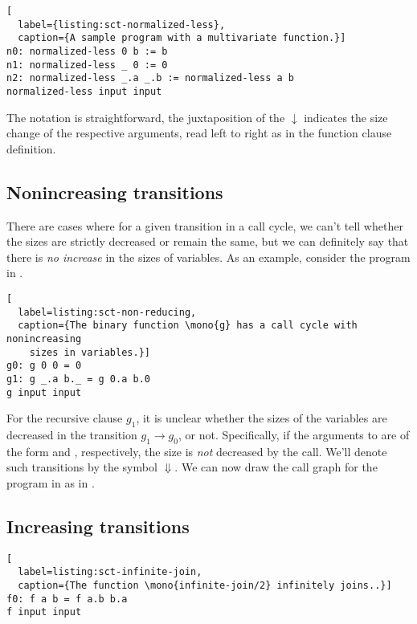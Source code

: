\begin{lstlisting}[
  label={listing:sct-normalized-less},
  caption={A sample program with a multivariate function.}]
n0: normalized-less 0 b := b
n1: normalized-less _ 0 := 0
n2: normalized-less _.a _.b := normalized-less a b
normalized-less input input
\end{lstlisting}



The notation is straightforward, the juxtaposition of the $\downarrow$
indicates the size change of the respective arguments, read left to right as in
the function clause definition.

\subsection{Nonincreasing transitions}

There are cases where for a given transition in a call cycle, we can't tell
whether the sizes are strictly decreased or remain the same, but we can
definitely say that there is \emph{no increase} in the sizes of variables. As
an example, consider the program in .

\begin{lstlisting}[
  label=listing:sct-non-reducing,
  caption={The binary function \mono{g} has a call cycle with nonincreasing
    sizes in variables.}]
g0: g 0 0 = 0
g1: g _.a b._ = g 0.a b.0
g input input
\end{lstlisting}


For the recursive clause $g_1$, it is unclear whether the sizes of the
variables are decreased in the transition $g_1\rightarrow g_0$, or not.
Specifically, if the arguments to  are of the form  and
, respectively, the size is \emph{not} decreased by the call. We'll
denote such transitions by the symbol $\Downarrow$. We can now draw the call
graph for the program in  as in
.



\subsection{Increasing transitions}




\begin{lstlisting}[
  label=listing:sct-infinite-join,
  caption={The function \mono{infinite-join/2} infinitely joins..}]
f0: f a b = f a.b b.a
f input input
\end{lstlisting}

